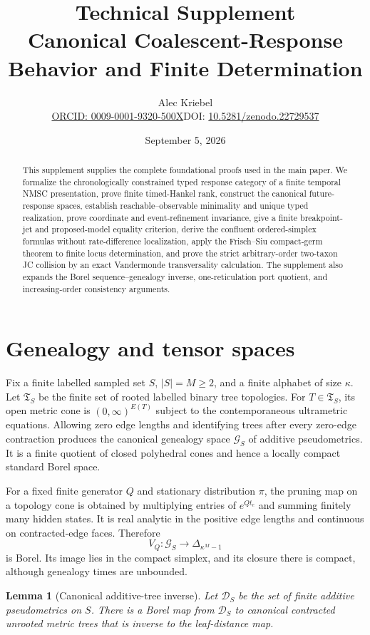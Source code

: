 \documentclass[11pt]{article}
\title{\textbf{Technical Supplement}\\Canonical Coalescent-Response Behavior and Finite Determination}
\author{Alec Kriebel\\\small\href{https://orcid.org/0009-0001-9320-500X}{ORCID: 0009-0001-9320-500X}\quad DOI: \href{https://doi.org/10.5281/zenodo.22729537}{10.5281/zenodo.22729537}}
\date{September 5, 2026}
\newtheorem{lemma}[theorem]{Lemma}
\newcommand{\cG}{\mathcal G}
\begin{document}
\maketitle

\begin{abstract}
This supplement supplies the complete foundational proofs used in the main paper.  We formalize the chronologically constrained typed response category of a finite temporal NMSC presentation, prove finite timed-Hankel rank, construct the canonical future-response spaces, establish reachable--observable minimality and unique typed realization, prove coordinate and event-refinement invariance, give a finite breakpoint-jet and proposed-model equality criterion, derive the confluent ordered-simplex formulas without rate-difference localization, apply the Frisch--Siu compact-germ theorem to finite locus determination, and prove the strict arbitrary-order two-taxon JC collision by an exact Vandermonde transversality calculation.  The supplement also expands the Borel sequence--genealogy inverse, one-reticulation port quotient, and increasing-order consistency arguments.
\end{abstract}

\section{Genealogy and tensor spaces}

Fix a finite labelled sampled set $S$, $|S|=M\ge2$, and a finite alphabet of size $\kappa$.  Let $\mathfrak T_S$ be the finite set of rooted labelled binary tree topologies.  For $T\in\mathfrak T_S$, its open metric cone is $(0,\infty)^{E(T)}$ subject to the contemporaneous ultrametric equations.  Allowing zero edge lengths and identifying trees after every zero-edge contraction produces the canonical genealogy space $\cG_S$ of additive pseudometrics.  It is a finite quotient of closed polyhedral cones and hence a locally compact standard Borel space.

For a fixed finite generator $Q$ and stationary distribution $\pi$, the pruning map on a topology cone is obtained by multiplying entries of $e^{Qt_e}$ and summing finitely many hidden states.  It is real analytic in the positive edge lengths and continuous on contracted-edge faces.  Therefore
\[
V_Q:\cG_S\longrightarrow\Delta_{\kappa^M-1}
\]
is Borel.  Its image lies in the compact simplex, and its closure there is compact, although genealogy times are unbounded.

\begin{lemma}[Canonical additive-tree inverse]
\label{lem:borel-tree}
Let $\mathcal D_S$ be the set of finite additive pseudometrics on $S$.  There is a Borel map from $\mathcal D_S$ to canonical contracted unrooted metric trees that is inverse to the leaf-distance map.
\end{lemma}
\end{document}
